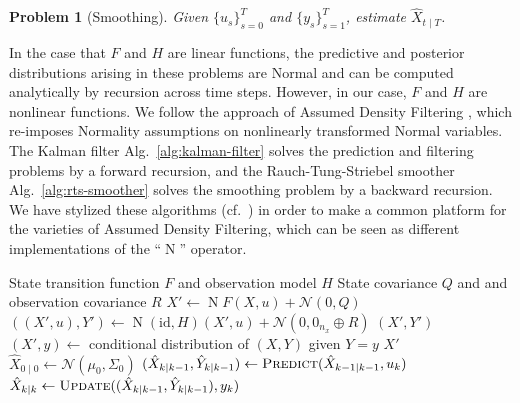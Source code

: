 \documentclass{article} %
\newtheorem{problem}{Problem}
\DeclareMathOperator{\normal}{\mathrm N}
\begin{document}
\begin{problem}[Smoothing]\label{problem:smoothing}
  Given \(\{u_s\}_{s=0}^T\) and \(\{y_s\}_{s=1}^T\), estimate \(\hat X_{t \mid T}\).
\end{problem}

In the case that \(F\) and \(H\) are linear functions,
the predictive and posterior distributions arising in these problems are Normal and can be computed analytically by recursion across time steps.
However, in our case, \(F\) and \(H\) are nonlinear functions.
We follow the approach of Assumed Density Filtering \cite{deisenroth_analytic_2009}, 
which re-imposes Normality assumptions on nonlinearly transformed Normal variables.
The Kalman filter Alg.~\ref{alg:kalman-filter} solves the prediction
and filtering problems by a forward recursion, and the
Rauch-Tung-Striebel smoother Alg.~\ref{alg:rts-smoother} solves the
smoothing problem by a backward recursion.
We have stylized these algorithms (cf.~\citealt[Algorithms~5.3--4, 38.1--2]{hennig_probabilistic_2022}) in order to make a common platform for the varieties of Assumed Density Filtering, which can be seen as different implementations of the ``\(\normal\)'' operator.

\begin{algorithm}
  \caption{
    \label{alg:kalman-filter}
    General Kalman algorithm for recursive \textbf{prediction} (problem
    \ref{problem:prediction}) and \textbf{filtering} (problem
  \ref{problem:filtering})}
  \begin{algorithmic}[1]
    \Require State transition function \(F\) and observation model \(H\)
    \Require State covariance \(Q\) and and observation covariance \(R\)
    \State
    \(X' \gets \normal F(X, u) + \mathcal{N}(0, Q)\)
    \State
    \(((X', u), Y') \gets\normal (\text{id}, H)(X', u) +
    \mathcal{N}(0, 0_{n_x} \oplus R)\)
    \State\Return \((X', Y')\)
    \EndFunction
    \State
    \((X', y) \gets\) conditional distribution of \((X,Y)\)
    given \(Y=y\)
    \State\Return \(X'\)
    \EndFunction
    \State \(\hat X_{0 \mid 0} \gets \mathcal{N}(\mu_0, \Sigma_0)\)
    \State \( (\hat X_{k \mid k-1}, \hat Y_{k \mid k-1})
    \gets \textsc{Predict}(\hat X_{k-1 \mid k-1}, u_k) \)
    \State \( \hat X_{k \mid k}  \gets \textsc{Update}((\hat
    X_{k \mid k-1}, \hat Y_{k \mid k-1}), y_k) \)
    \EndFor
    \EndProcedure
  \end{algorithmic}
\end{algorithm}
\end{document}
